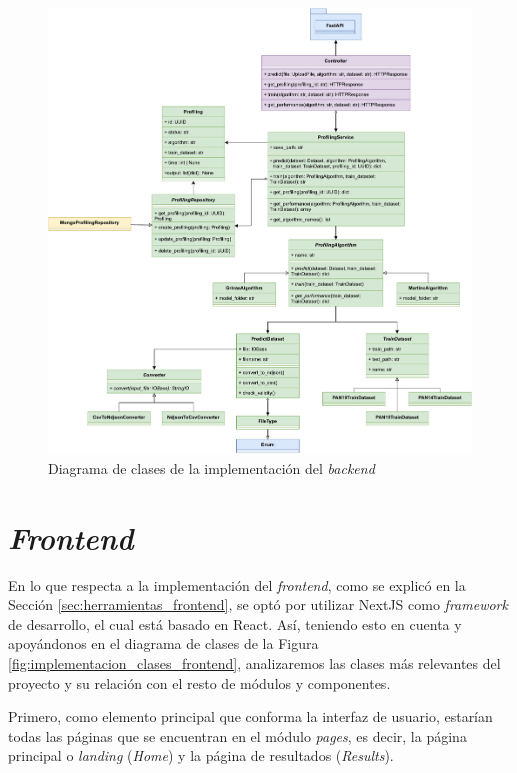 \bigskip
\begin{figure}[H]
	\centering
	\includegraphics[width=\textwidth]{diagramas/clases_back.pdf}
	\caption{Diagrama de clases de la implementación del \textit{backend}}
	\label{fig:implementacion_clases_backend}
\end{figure}

\section{\textit{Frontend}}

En lo que respecta a la implementación del \textit{frontend}, como se explicó en la Sección \ref{sec:herramientas_frontend}, se optó
por utilizar NextJS como \textit{framework} de desarrollo, el cual está basado en React. Así, teniendo esto en cuenta y apoyándonos
en el diagrama de clases de la Figura \ref{fig:implementacion_clases_frontend}, analizaremos
las clases más relevantes del proyecto y su relación con el resto de módulos y componentes.

\bigskip
Primero, como elemento principal que conforma la interfaz de usuario, estarían todas las páginas que se encuentran en el módulo \textit{pages}, es decir,
la página principal o \textit{landing} (\textit{Home}) y la página de resultados (\textit{Results}).

